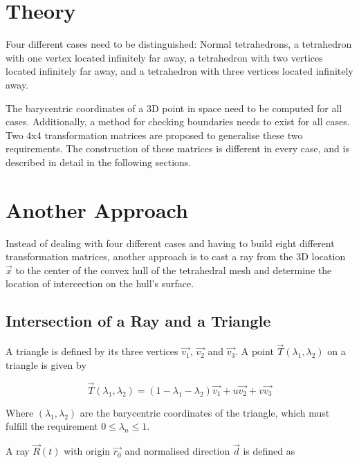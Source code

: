 \section{Theory}

Four   different  cases  need  to  be  distinguished:  Normal  tetrahedrons,   a
tetrahedron with one vertex located infinitely far away, a  tetrahedron with two
vertices  located  infinitely  far  away,  and a tetrahedron with three vertices
located infinitely away.

The barycentric coordinates of a 3D point in space  need  to be computed for all
cases. Additionally, a method  for  checking  boundaries  needs to exist for all
cases. Two 4x4 transformation  matrices  are  proposed  to  generalise these two
requirements. The construction of these matrices is different in every case, and
is described in detail in the following sections.




\section{Another Approach}

Instead of dealing with four different cases and having to build eight different
transformation matrices,  another approach is to cast a ray from the 3D location
$\vec{x}$ to the center of the convex hull of the tetrahedral mesh and determine
the location of intercection on the hull's surface.

\subsection{Intersection of a Ray and a Triangle}

A  triangle  is  defined  by  its  three  vertices  $\vec{v_1}$, $\vec{v_2}$ and
$\vec{v_3}$. A point $\vec{T}(\lambda_1,\lambda_2)$ on a  triangle  is  given by

\begin{equation}
    \label{eq:point_on_triangle}
    \vec{T}(\lambda_1,\lambda_2) = (1-\lambda_1-\lambda_2)\vec{v_1} + u\vec{v_2} + v\vec{v_3}
\end{equation}

Where  $(\lambda_1,\lambda_2)$  are the barycentric coordinates of the triangle,
which must fulfill the requirement $0\le\lambda_n\le 1$.

A  ray  $\vec{R}(t)$  with  origin $\vec{r_0}$ and normalised direction  $\vec{d}$  is
defined as


